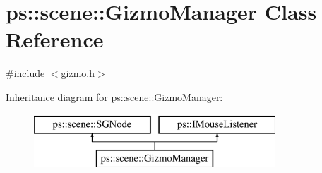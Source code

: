 \hypertarget{classps_1_1scene_1_1GizmoManager}{}\section{ps\+:\+:scene\+:\+:Gizmo\+Manager Class Reference}
\label{classps_1_1scene_1_1GizmoManager}


{\ttfamily \#include $<$gizmo.\+h$>$}

Inheritance diagram for ps\+:\+:scene\+:\+:Gizmo\+Manager\+:\begin{figure}[H]
\begin{center}
\leavevmode
\includegraphics[height=2.000000cm]{classps_1_1scene_1_1GizmoManager}
\end{center}
\end{figure}
